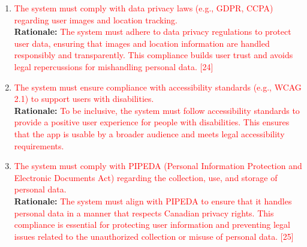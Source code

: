 \documentclass{article}
\begin{document}
\begin{enumerate}[{LR-COMP}1. ]

	\item \textcolor{red}{The system must comply with data privacy laws (e.g., GDPR, CCPA) regarding user images and location tracking.}\\
	\textbf{Rationale:} \textcolor{red}{The system must adhere to data privacy regulations to protect user data, ensuring that images and location information are handled responsibly and transparently. This compliance builds user trust and avoids legal repercussions for mishandling personal data. [24]}\\

	\item \textcolor{red}{The system must ensure compliance with accessibility standards (e.g., WCAG 2.1) to support users with disabilities.}\\
	\textbf{Rationale:} \textcolor{red}{To be inclusive, the system must follow accessibility standards to provide a positive user experience for people with disabilities. This ensures that the app is usable by a broader audience and meets legal accessibility requirements.}\\

	\item \textcolor{red}{The system must comply with PIPEDA (Personal Information Protection and Electronic Documents Act) regarding the collection, use, and storage of personal data.}\\
	\textbf{Rationale:} \textcolor{red}{The system must align with PIPEDA to ensure that it handles personal data in a manner that respects Canadian privacy rights. This compliance is essential for protecting user information and preventing legal issues related to the unauthorized collection or misuse of personal data. [25]}\\


\end{enumerate}
\end{document}

